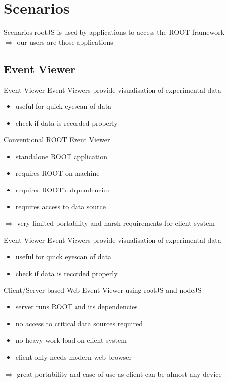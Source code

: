 \section{Scenarios}
\begin{frame}{Scenarios}
rootJS is used by applications to access the ROOT framework\\
\pause $\Rightarrow $ our users are those applications
\end{frame}

\subsection{Event Viewer}
\begin{frame}{Event Viewer}
 \pause   Event Viewers provide visualisation of experimental data
  \begin{itemize}
    \pause \item useful for quick eyescan of data
    \pause \item check if data is recorded properly
  \end{itemize}
  \pause
  \medskip
   Conventional ROOT Event Viewer
  \begin{itemize}
  \pause \item standalone ROOT application
   \pause \item requires ROOT on machine
   \pause \item requires ROOT's dependencies
   \pause \item requires access to data source
   \end{itemize}
   \pause $\Rightarrow $ very limited portability and harsh requirements for client system
\end{frame}

\begin{frame}{Event Viewer}
 Event Viewers provide visualisation of experimental data
  \begin{itemize}
   \item useful for quick eyescan of data
   \item check if data is recorded properly
  \end{itemize}
   \medskip
   Client/Server based Web Event Viewer using rootJS and nodeJS
  \begin{itemize}
  \pause \item server runs ROOT and its dependencies
   \pause \item no access to critical data sources required
   \pause \item no heavy work load on client system
   \pause \item client only needs modern web browser
   \end{itemize}

   \pause $\Rightarrow $ great portability and ease of use as client can be almost any device
\end{frame}


